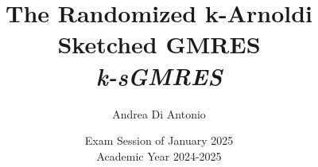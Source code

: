 
\newcommand{\documenttitle}{The Randomized k-Arnoldi Sketched GMRES}
\newcommand{\documentsubtitle}{k-sGMRES}

\newcommand{\documentauthor}{Andrea Di Antonio}
\newcommand{\documentdate}{Exam Session of January 2025 \\ Academic Year 2024-2025}

\title{\textbf{\documenttitle} \\ \textit{\documentsubtitle}}
\author{\documentauthor}
\date{\documentdate}

\newcommand{\accentcolor}{solarized-blue} %
\newcommand{\urlcolor}{solarized-red} %